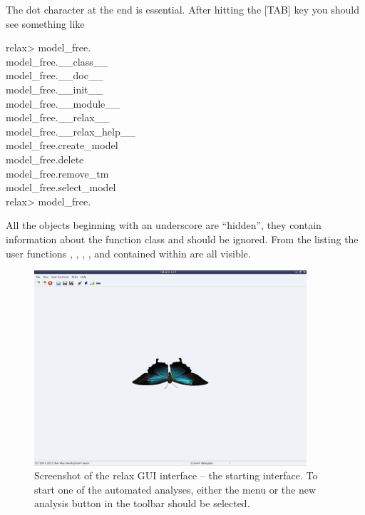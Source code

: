 
The dot character at the end is essential.  After hitting the [TAB] key you should see something like

\begin{exampleenv}
relax> model\_free. \\
model\_free.\_\_class\_\_ \\
model\_free.\_\_doc\_\_ \\
model\_free.\_\_init\_\_ \\
model\_free.\_\_module\_\_ \\
model\_free.\_\_relax\_\_ \\
model\_free.\_\_relax\_help\_\_ \\
model\_free.create\_model \\
model\_free.delete \\
model\_free.remove\_tm \\
model\_free.select\_model \\
relax> model\_free.
\end{exampleenv}

All the objects beginning with an underscore are ``hidden'', they contain information about the function class and should be ignored.  From the listing the user functions , , , , and  contained within  are all visible.

\begin{figure}
\centerline{\includegraphics[width=0.9\textwidth, bb=14 14 1065 768]{graphics/screenshots/start}}
\caption[GUI screenshot]{Screenshot of the relax GUI interface -- the starting interface.  To start one of the automated analyses, either the menu  or the new analysis button in the toolbar should be selected.}\label{fig: GUI screenshot - start}
\end{figure}



